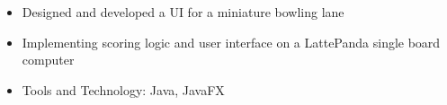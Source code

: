 \begin{itemize}
    \setlength\itemsep{0pt}
    \setlength{\parskip}{0pt}
    \item Designed and developed a UI for a miniature bowling lane
    \item Implementing scoring logic and user interface on a LattePanda single board computer
    \item Tools and Technology: Java, JavaFX
\end{itemize}
